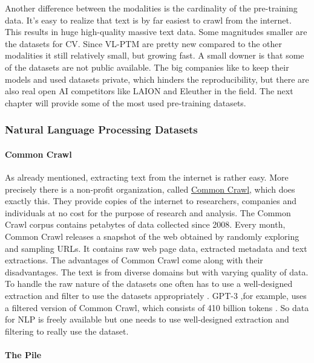 \documentclass[
]{krantz}
\begin{document}
Another difference between the modalities is the cardinality of the pre-training data. It's easy to realize that text is by far easiest to crawl from the internet. This results in huge high-quality massive text data. Some magnitudes smaller are the datasets for CV. Since VL-PTM are pretty new compared to the other modalities it still relatively small, but growing fast. A small downer is that some of the datasets are not public available. The big companies like to keep their models and used datasets private, which hinders the reproducibility, but there are also real open AI competitors like LAION and Eleuther in the field. The next chapter will provide some of the most used pre-training datasets.

\hypertarget{natural-language-processing-datasets}{%
\subsubsection{Natural Language Processing Datasets}\label{natural-language-processing-datasets}}

\hypertarget{common-crawl}{%
\paragraph{Common Crawl}\label{common-crawl}}

As already mentioned, extracting text from the internet is rather easy. More precisely there is a non-profit organization, called \href{https://commoncrawl.org}{Common Crawl}, which does exactly this. They provide copies of the internet to researchers, companies and individuals at no cost for the purpose of research and analysis. The Common Crawl corpus contains petabytes of data collected since 2008. Every month, Common Crawl releases a snapshot of the web obtained by randomly exploring and sampling URLs. It contains raw web page data, extracted metadata and text extractions. The advantages of Common Crawl come along with their disadvantages. The text is from diverse domains but with varying quality of data. To handle the raw nature of the datasets one often has to use a well-designed extraction and filter to use the datasets appropriately \citep{gao2020pile}. GPT-3 ,for example, uses a filtered version of Common Crawl, which consists of 410 billion tokens \citep{brown2020language}. So data for NLP is freely available but one needs to use well-designed extraction and filtering to really use the dataset.

\hypertarget{the-pile}{%
\paragraph{The Pile}\label{the-pile}}
\end{document}

